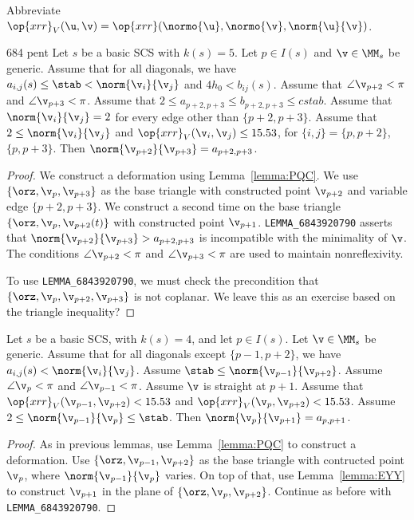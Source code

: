 Abbreviate $\op{xrr}_V (\u,\v) = \op{xrr} (\normo{\u},\normo{\v},\norm{\u}{\v})$.

\begin{lemma}{684 pent}\label{lemma:684-pent}
Let $s$ be a basic SCS with $k(s)=5$.  Let $p\in I(s)$ and $\v\in \MM_s$ be generic.
Assume that for all diagonals, we have $a_{i,j}(s) \le \stab <\norm{\v_i}{\v_j}$ 
and $4h_0 < b_{ij}(s)$.
Assume that $\angle \v_{p+2} < \pi$ and $\angle \v_{p+3} < \pi$.
Assume that $2\le a_{p+2,p+3} \le b_{p+2,p+3} \le cstab$.
Assume that $\norm{\v_i}{\v_j}=2$ for every edge other than $\{p+2,p+3\}$.
Assume that $2\le \norm{\v_i}{\v_j}$ and $\op{xrr}_V(\v_i,\v_j)\le 15.53$, 
for $\{i,j\} = \{p,p+2\}$, $\{p,p+3\}$.
Then $\norm{\v_{p+2}}{\v_{p+3}} = a_{p+2,p+3}$.
\end{lemma}

\begin{proof} We construct a deformation using Lemma~\ref{lemma:PQC}.  We use $\{\orz,\v_p,\v_{p+3}\}$ as
the base triangle with constructed point $\v_{p+2}$ and variable edge $\{p+2,p+3\}$.  We construct a second
time on the base triangle $\{\orz,\v_p,\v_{p+2}(t)\}$ with constructed point $\v_{p+1}$.
{\tt LEMMA\_6843920790} asserts that $\norm{\v_{p+2}}{\v_{p+3}} > a_{p+2,p+3}$ is incompatible with the minimality of $\v$.
The conditions  $\angle \v_{p+2} < \pi$ and $\angle \v_{p+3} < \pi$ 
are used to maintain nonreflexivity.

To use {\tt LEMMA\_6843920790}, we must check the precondition that $\{\orz,\v_p,\v_{p+2},\v_{p+3}\}$
is not coplanar.  We leave this as an exercise based on the triangle inequality?
\end{proof}

\begin{lemma}[684 str]\label{lemma:684 str}
Let $s$ be a basic SCS, with $k(s)=4$, and let $p\in I(s)$.  Let $\v\in \MM_s$ be generic.
Assume that for all diagonals except $\{p-1,p+2\}$,
we have $a_{i,j}(s)<\norm{\v_i}{\v_j}$.  
Assume $\stab \le \norm{\v_{p-1}}{\v_{p+2}}$.
Assume $\angle \v_p < \pi$ and $\angle \v_{p-1} < \pi$.
Assume $\v$ is straight at $p+1$.
Assume that $\op{xrr}_V(\v_{p-1},\v_{p+2})<15.53$ and $\op{xrr}_V(\v_p,\v_{p+2})< 15.53$.
Assume $2\le  \norm{\v_{p-1}}{\v_{p}}\le \stab$.
Then $\norm{\v_p}{\v_{p+1}} = a_{p,p+1}$.
\end{lemma}

\begin{proof} As in previous lemmas, use Lemma~\ref{lemma:PQC} to construct a deformation.
Use $\{\orz,\v_{p-1},\v_{p+2}\}$ as the base triangle with contructed point $\v_p$, where $\norm{\v_{p-1}}{\v_p}$ varies.
On top of that, use Lemma~\ref{lemma:EYY} to construct $\v_{p+1}$ in the plane of $\{\orz,\v_p,\v_{p+2}\}$.
Continue as before with  {\tt LEMMA\_6843920790}.
\end{proof}

